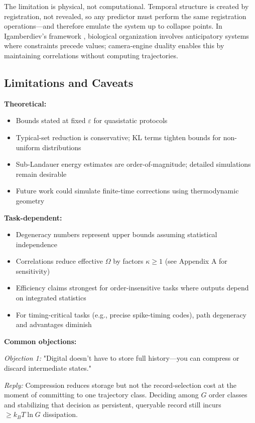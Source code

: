 \documentclass[12pt]{article}
\numberwithin{equation}{section}
\begin{document}
The limitation is physical, not computational. Temporal structure is created by registration, not revealed, so any predictor must perform the same registration operations---and therefore emulate the system up to collapse points. In Igamberdiev's framework \cite{igamberdiev2014}, biological organization involves anticipatory systems where constraints precede values; camera-engine duality enables this by maintaining correlations without computing trajectories.

\subsection{Limitations and Caveats}

\textbf{Theoretical:}
\begin{itemize}
\item Bounds stated at fixed $\varepsilon$ for quasistatic protocols
\item Typical-set reduction is conservative; KL terms tighten bounds for non-uniform distributions
\item Sub-Landauer energy estimates are order-of-magnitude; detailed simulations remain desirable
\item Future work could simulate finite-time corrections using thermodynamic geometry \cite{sivak2012}
\end{itemize}

\textbf{Task-dependent:}
\begin{itemize}
\item Degeneracy numbers represent upper bounds assuming statistical independence
\item Correlations reduce effective $\Omega$ by factors $\kappa \ge 1$ (see Appendix A for sensitivity)
\item Efficiency claims strongest for order-insensitive tasks where outputs depend on integrated statistics
\item For timing-critical tasks (e.g., precise spike-timing codes), path degeneracy and advantages diminish
\end{itemize}

\textbf{Common objections:}

\emph{Objection 1:} "Digital doesn't have to store full history—you can compress or discard intermediate states."

\emph{Reply:} Compression reduces storage but not the record-selection cost at the moment of committing to one trajectory class. Deciding among $G$ order classes and stabilizing that decision as persistent, queryable record still incurs $\ge k_BT\ln G$ dissipation.
\end{document}
